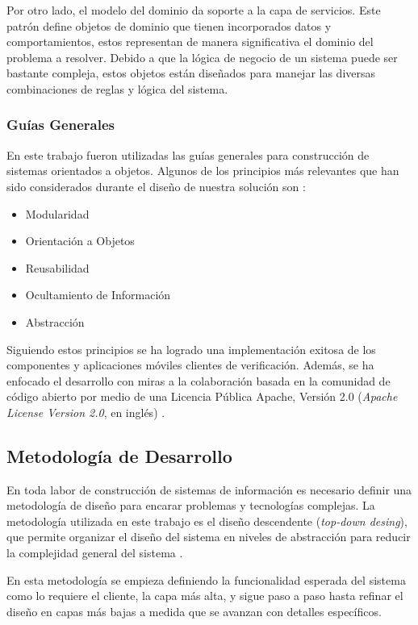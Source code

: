 Por otro lado, el modelo del dominio da soporte a la capa de servicios.
Este patrón define objetos de dominio que tienen incorporados datos
y comportamientos, estos representan de manera significativa el dominio
del problema a resolver. Debido a que la lógica de negocio de un sistema
puede ser bastante compleja, estos objetos están diseñados para manejar
las diversas combinaciones de reglas y lógica del sistema.

\subsubsection{Guías Generales}

En este trabajo fueron utilizadas las guías generales para construcción
de sistemas orientados a objetos. Algunos de los principios más relevantes
que han sido considerados durante el diseño de nuestra solución son
\cite{Albin2003}:
\begin{itemize}
\item Modularidad
\item Orientación a Objetos
\item Reusabilidad
\item Ocultamiento de Información
\item Abstracción
\end{itemize}
Siguiendo estos principios se ha logrado una implementación exitosa
de los componentes y aplicaciones móviles clientes de verificación.
Además, se ha enfocado el desarrollo con miras a la colaboración basada
en la comunidad de código abierto por medio de una Licencia Pública
Apache, Versión 2.0 (\emph{Apache License Version 2.0}, en inglés)
\cite{GimenezYegros2016c}.

\subsection{Metodología de Desarrollo}

\label{ssec52:metodologia}En toda labor de construcción de sistemas
de información es necesario definir una metodología de diseño para
encarar problemas y tecnologías complejas. La metodología utilizada
en este trabajo es el diseño descendente (\emph{top-down desing}),
que permite organizar el diseño del sistema en niveles de abstracción
para reducir la complejidad general del sistema \cite{Albin2003}. 

En esta metodología se empieza definiendo la funcionalidad esperada
del sistema como lo requiere el cliente, la capa más alta, y sigue
paso a paso hasta refinar el diseño en capas más bajas a medida que
se avanzan con detalles específicos. 

